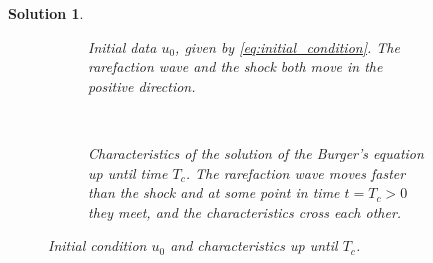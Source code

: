 \documentclass[10pt,letterpaper]{article}
\theoremstyle{break}
\newtheorem{mysolution}{Solution}
\newenvironment{solution}{\begin{mysolution}}{\end{mysolution}}
\begin{document}
\begin{solution}
    \begin{figure}
        \centering
        \begin{subfigure}[b]{0.5\textwidth}
            \caption{Initial data $u_0$, given by \eqref{eq:initial_condition}.
            The rarefaction wave and the shock both move in the positive direction.}
            \label{fig:u_0}
        \end{subfigure}
        ~
        \begin{subfigure}[b]{0.5\textwidth}
            \caption{Characteristics of the solution of the Burger's equation
            up until time $T_c$. The rarefaction wave moves faster than
            the shock and at some point in time $t = T_c > 0$ they meet,
            and the characteristics cross each other.}
            \label{fig:characteritics}
        \end{subfigure}
        \caption{Initial condition $u_0$ and characteristics up until $T_c$.}
        \label{problem3_part1}
    \end{figure}
    

\end{solution}
\end{document}
